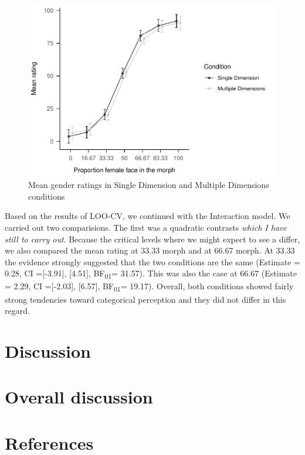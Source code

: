 \documentclass[
  man]{apa7}
\begin{document}
\begin{figure}
\centering
\includegraphics{papaja-test_files/figure-latex/exp-two-inf-1.pdf}
\caption{\label{fig:exp-two-inf}Mean gender ratings in Single Dimension and Multiple Dimensions conditions}
\end{figure}

Based on the results of LOO-CV, we continued with the Interaction model. We carried out two comparisions. The first was a quadratic contrasts \emph{which I have still to carry out}. Because the critical levels where we might expect to see a differ, we also compared the mean rating at 33.33 morph and at 66.67 morph. At 33.33 the evidence strongly suggested that the two conditions are the same
(Estimate = 0.28, CI ={[}-3.91{]}, {[}4.51{]}, BF\textsubscript{01}= 31.57). This was also the case at 66.67
(Estimate = 2.29, CI ={[}-2.03{]}, {[}6.57{]}, BF\textsubscript{01}= 19.17). Overall, both conditions showed fairly strong tendencies toward categorical perception and they did not differ in this regard.

\hypertarget{discussion-1}{%
\section{Discussion}\label{discussion-1}}

\hypertarget{overall-discussion}{%
\section{Overall discussion}\label{overall-discussion}}

\newpage

\hypertarget{references}{%
\section{References}\label{references}}
\end{document}
